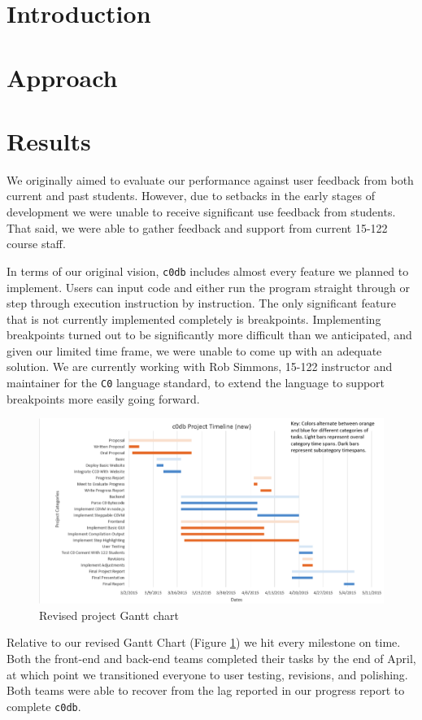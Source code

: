 \documentclass[11pt]{article}
\begin{document}
\section{Introduction}

\section{Approach}

\section{Results}
\par
We originally aimed to evaluate our performance against user feedback from both
current and past students. However, due to setbacks in the early stages of
development we were unable to receive significant use feedback from students.
That said, we were able to gather feedback and support from current 15-122
course staff.

In terms of our original vision, {\tt c0db} includes almost every feature we
planned to implement. Users can input code and either run the program straight
through or step through execution instruction by instruction. The only
significant feature that is not currently implemented completely is breakpoints.
Implementing breakpoints turned out to be significantly more difficult than we
anticipated, and given our limited time frame, we were unable to come up with an
adequate solution. We are currently working with Rob Simmons, 15-122 instructor
and maintainer for the {\tt C0} language standard, to extend the language to
support breakpoints more easily going forward.

\begin{figure}[h]
  \includegraphics[width=\linewidth]{new-gantt}
  \caption{Revised project Gantt chart}
  \label{gantt}
\end{figure}
Relative to our revised Gantt Chart (Figure \ref{gantt}) we hit every milestone
on time. Both the front-end and back-end teams completed their tasks by the end
of April, at which point we transitioned everyone to user testing, revisions,
and polishing. Both teams were able to recover from the lag reported in our
progress report to complete {\tt c0db}.
\end{document}
